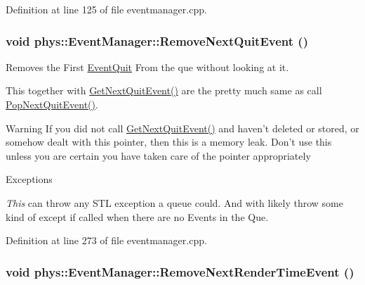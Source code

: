 Definition at line 125 of file eventmanager.cpp.

\hypertarget{classphys_1_1EventManager_a5031871aa6e044764ec2963228f735dd}{
\subsubsection[{RemoveNextQuitEvent}]{\setlength{\rightskip}{0pt plus 5cm}void phys::EventManager::RemoveNextQuitEvent ()}}
\label{da/dde/classphys_1_1EventManager_a5031871aa6e044764ec2963228f735dd}


Removes the First \hyperlink{classphys_1_1EventQuit}{EventQuit} From the que without looking at it. 

This together with \hyperlink{classphys_1_1EventManager_ad7da09e5422b1db79ac4187ee9198d0c}{GetNextQuitEvent()} are the pretty much same as call \hyperlink{classphys_1_1EventManager_a9b0d8e4d76fef35423bb862d7127b747}{PopNextQuitEvent()}. \begin{DoxyWarning}{Warning}
If you did not call \hyperlink{classphys_1_1EventManager_ad7da09e5422b1db79ac4187ee9198d0c}{GetNextQuitEvent()} and haven't deleted or stored, or somehow dealt with this pointer, then this is a memory leak. Don't use this unless you are certain you have taken care of the pointer appropriately 
\end{DoxyWarning}

\begin{DoxyExceptions}{Exceptions}
\item[{\em This}]can throw any STL exception a queue could. And with likely throw some kind of except if called when there are no Events in the Que. \end{DoxyExceptions}


Definition at line 273 of file eventmanager.cpp.

\hypertarget{classphys_1_1EventManager_af1204912be3554312e66d3a777c1f99b}{
\subsubsection[{RemoveNextRenderTimeEvent}]{\setlength{\rightskip}{0pt plus 5cm}void phys::EventManager::RemoveNextRenderTimeEvent ()}}
\label{da/dde/classphys_1_1EventManager_af1204912be3554312e66d3a777c1f99b}



